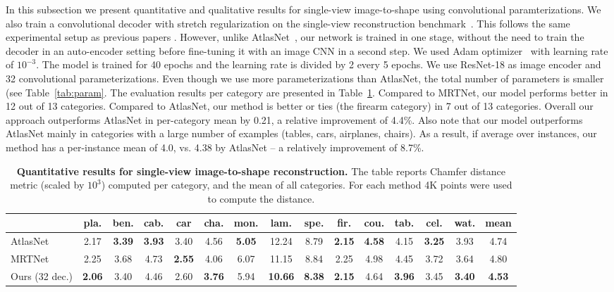In this subsection we present quantitative and qualitative results for single-view image-to-shape using convolutional paramterizations.
We also train a convolutional decoder with stretch regularization on the single-view reconstruction benchmark~\cite{choy20163d}.
This follows the same experimental setup as previous papers \cite{fan2016point, choy20163d, atlasnet, mrt18}.
However, unlike AtlasNet~\cite{atlasnet}, our network is trained in one stage, without the need to
train the decoder in an auto-encoder setting before fine-tuning it with an image CNN in a second step.
We used Adam optimizer~\cite{kingma2014adam} with learning rate of $10^{-3}$. 
The model is trained for 40 epochs and the learning rate is divided by 2 every 5 epochs.
We use ResNet-18 as image encoder and 32 convolutional parameterizations.
Even though we use more parameterizations than AtlasNet, the total number of parameters is smaller (see Table~\ref{tab:param}.
The evaluation results per category are presented in Table~\ref{tab:svr}.
Compared to MRTNet, our model performs better in 12 out of 13 categories. Compared to AtlasNet, our method is better or ties (the firearm category) in 7 out of 13 categories.
Overall our approach outperforms AtlasNet in per-category mean by 0.21, a relative improvement of 4.4\%. Also note that our model outperforms AtlasNet mainly in categories with
a large number of examples (tables, cars, airplanes, chairs). As a result, if average over instances, our method has a per-instance mean of 4.0, vs. 4.38 by AtlasNet -- a relatively improvement of  8.7\%.

\begin{table}[h!]
\centering
{
\small
  \begin{tabular}{l|c|c|c|c|c|c|c|c|c|c|c|c|c||c}
   &  pla. &  ben. &  cab. &  car &  cha. &  mon. &  lam. &  spe. &  fir. &  cou. &  tab. &  cel. &  wat. &  \textbf{mean} \\
  \hline
 AtlasNet~\cite{atlasnet} &
2.17 &
\textbf{3.39} &
\textbf{3.93} &
3.40 &
4.56 &
\textbf{5.05} &
12.24 &
8.79 &
\textbf{2.15} &
\textbf{4.58} &
4.15 &
\textbf{3.25} &
3.93 &
4.74\\
 
 MRTNet~\cite{mrt18} &
2.25 &
3.68 &
4.73 &
\textbf{2.55} &
4.06 &
6.07 &
11.15 &
8.84 &
2.25 &
4.98 &
4.45 &
3.72 &
3.64 &
4.80\\



Ours (32 dec.)&
\textbf{2.06} &
3.40 &
4.46 &
2.60 &
\textbf{3.76} &
5.94 &
\textbf{10.66} &
\textbf{8.38} &
\textbf{2.15} &
4.64 &
\textbf{3.96} &
3.45 &
\textbf{3.40} &
\textbf{4.53} \\
  \end{tabular}
  }
\caption{\small \textbf{Quantitative results for single-view image-to-shape reconstruction.} The table reports Chamfer distance metric (scaled by $10^3$) computed per category, and the mean of all categories.
For each method 4K points were used to compute the distance. %
  }
  \label{tab:svr}
\end{table}

